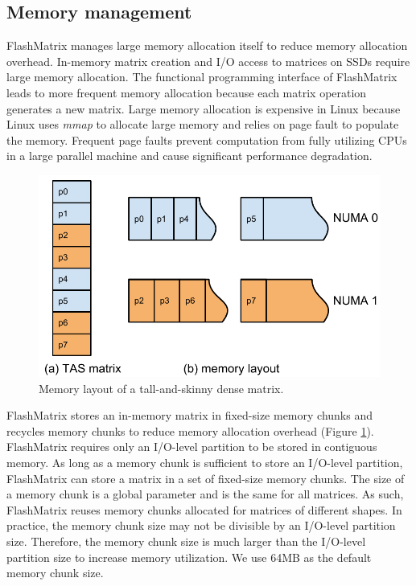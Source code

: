 \subsection{Memory management} \label{sec:mem}
FlashMatrix manages large memory allocation itself to reduce memory allocation overhead.
In-memory matrix creation and I/O access to matrices on SSDs require large memory
allocation. The functional programming interface of FlashMatrix leads to more
frequent memory allocation because each matrix operation generates a new matrix. 
Large memory allocation is expensive in Linux because Linux uses \textit{mmap}
to allocate large memory and relies on page fault to populate the memory.
Frequent page faults prevent computation from fully utilizing CPUs in a large
parallel machine and cause significant performance degradation.

\begin{figure}
	\centering
	\includegraphics[scale=0.5]{./matrix_mem.pdf}
	\caption{Memory layout of a tall-and-skinny dense matrix.}
	\label{fig:mat_mem}
\end{figure}

FlashMatrix stores an in-memory matrix in fixed-size memory chunks and
recycles memory chunks to reduce memory allocation overhead (Figure
\ref{fig:mat_mem}). FlashMatrix requires only an I/O-level partition to
be stored in contiguous memory. As long as a memory chunk is sufficient
to store an I/O-level partition, FlashMatrix can store a matrix in a set
of fixed-size memory chunks. The size of a memory chunk is a global parameter
and is the same for all matrices. As such, FlashMatrix reuses memory chunks
allocated for matrices of different shapes. In practice, the memory chunk size
may not be divisible by an I/O-level partition size. Therefore, the memory chunk
size is much larger than the I/O-level partition size to increase
memory utilization. We use 64MB as the default memory chunk size.

